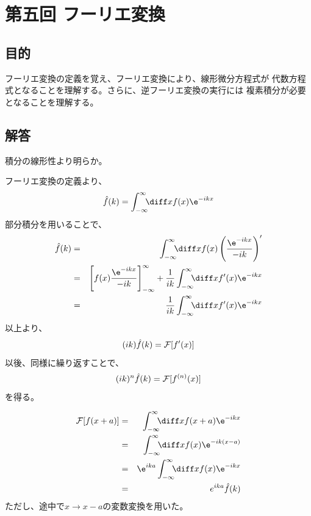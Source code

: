 \newpage
\section{第五回 フーリエ変換}

\subsection{目的}
フーリエ変換の定義を覚え、フーリエ変換により、線形微分方程式が
代数方程式となることを理解する。さらに、逆フーリエ変換の実行には
複素積分が必要となることを理解する。

\subsection{解答}

積分の線形性より明らか。

フーリエ変換の定義より、
\begin{equation}
  \hat{f}(k) = \int_{-\infty}^{\infty} \!\!\! \diff x f(x) \e^{-ikx}
\end{equation}
部分積分を用いることで、
\begin{eqnarray}
  \hat{f}(k) &=& \int_{-\infty}^{\infty} \!\!\! \diff x f(x) \left( \frac{\e^{-ikx}}{-ik}\right)'\\
  &=&
  \left[
    f(x)  \frac{\e^{-ikx}}{-ik}
    \right]_{-\infty}^{\infty}
  + \frac{1}{ik}\int_{-\infty}^{\infty} \!\!\! \diff x f'(x) \e^{-ikx}\\
  &=& \frac{1}{ik}\int_{-\infty}^{\infty} \!\!\! \diff x f'(x) \e^{-ikx}
\end{eqnarray}
以上より、
\begin{equation}
  (ik) \hat{f}(k) = {\cal F}[f'(x)]
\end{equation}
以後、同様に繰り返すことで、
\begin{equation}
  (ik)^n \hat{f}(k) = {\cal F}[f^{(n)}(x)]
\end{equation}
を得る。

\begin{eqnarray}
  {\cal F}[f(x+a)] &=& \int_{-\infty}^{\infty} \!\!\! \diff x f(x+a) \e^{-ikx}\\
  &=& \int_{-\infty}^{\infty} \!\!\! \diff x f(x) \e^{-ik(x-a)}\\
  &=& \e^{ika} \int_{-\infty}^{\infty} \!\!\! \diff x f(x) \e^{-ikx}\\
  &=& e^{ika} \hat{f}(k)
\end{eqnarray}
ただし、途中で$x \rightarrow x-a$の変数変換を用いた。

